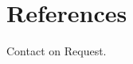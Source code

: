 \documentclass[11pt,a4paper,sans]{moderncv}        %
\begin{document}
\section{References}
Contact on Request.

\nocite{*}



\clearpage


\end{document}
